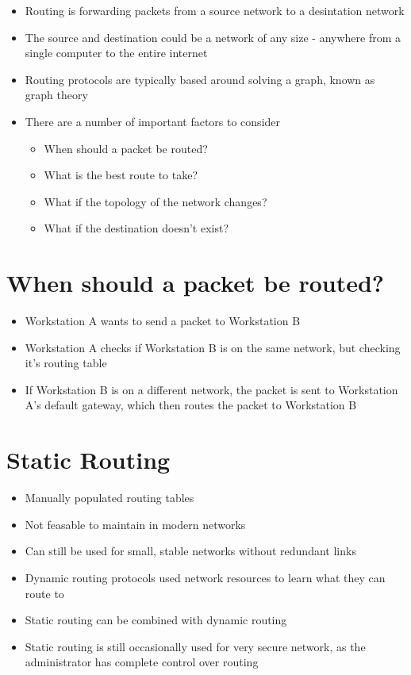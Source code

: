 
\begin{itemize}
  \item Routing is forwarding packets from a source network to a desintation network
  \item The source and destination could be a network of any size - anywhere from a single computer to the entire internet
  \item Routing protocols are typically based around solving a graph, known as graph theory
  \item There are a number of important factors to consider
  \begin{itemize}
    \item When should a packet be routed?
    \item What is the best route to take?
    \item What if the topology of the network changes?
    \item What if the destination doesn't exist?
  \end{itemize}
\end{itemize}
  
\section*{When should a packet be routed?}

\begin{itemize}
  \item Workstation A wants to send a packet to Workstation B
  \item Workstation A checks if Workstation B is on the same network, but checking it's routing table
  \item If Workstation B is on a different network, the packet is sent to Workstation A's default gateway, which then routes the packet to Workstation B
\end{itemize}

\section*{Static Routing}

\begin{itemize}
  \item Manually populated routing tables
  \item Not feasable to maintain in modern networks
  \item Can still be used for small, stable networks without redundant links
  \item Dynamic routing protocols used network resources to learn what they can route to
  \item Static routing can be combined with dynamic routing
  \item Static routing is still occasionally used for very secure network, as the administrator has complete control over routing
\end{itemize}

